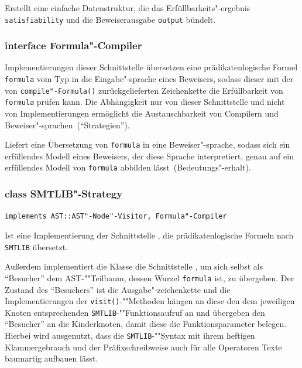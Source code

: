 \begin{description}%

    Erstellt eine einfache Datenstruktur, die das
    Erfüllbarkeits"-ergebnis \texttt{satisfiability} und die
    Beweiserausgabe \texttt{output} bündelt.%

\end{description}%

\subsubsection{interface Formula"-Compiler}%

Implementierungen dieser Schnittstelle übersetzen eine
prädikatenlogische Formel \texttt{formula} vom Typ
 in die Eingabe"-sprache eines Beweisers, sodass
dieser mit der von \texttt{compile"-Formula()} zurückgelieferten
Zeichenkette die Erfüllbarkeit von \texttt{formula} prüfen kann. Die
Abhängigkeit nur von dieser Schnittstelle und nicht von
Implementierungen ermöglicht die Austauschbarkeit von Compilern und
Beweiser"-sprachen~("`Strategien"').%

\begin{description}%

    Liefert eine Übersetzung von \texttt{formula} in eine
    Beweiser"-sprache, sodass sich ein erfüllendes Modell eines Beweisers, der
    diese Sprache interpretiert, genau auf ein erfüllendes Modell von
    \texttt{formula} abbilden lässt~(Bedeutungs"-erhalt).%


\end{description}%

\subsubsection{class SMTLIB"-Strategy}%

\texttt{implements AST::AST"-Node"-Visitor, Formula"-Compiler}%

Ist eine Implementierung der Schnittstelle ,
die prädikatenlogische Formeln nach \texttt{SMTLIB} übersetzt.%

Außerdem implementiert die Klasse die Schnittstelle
, um sich selbst als "`Besucher"' dem
AST-""Teilbaum, dessen Wurzel \texttt{formula} ist, zu übergeben. Der
Zustand des "`Besuchers"' ist die Ausgabe"-zeichenkette und die
Implementierungen der \texttt{visit()}-""Methoden hängen an diese den
dem jeweiligen Knoten entsprechenden \texttt{SMTLIB}-""Funktionsaufruf
an und übergeben den "`Besucher"' an die Kinderknoten, damit diese die
Funktionsparameter belegen. Hierbei wird ausgenutzt, dass die
\texttt{SMTLIB}-""Syntax mit ihrem heftigen Klammergebrauch und der
Präfixschreibweise auch für alle Operatoren Texte baumartig aufbauen
lässt.%

